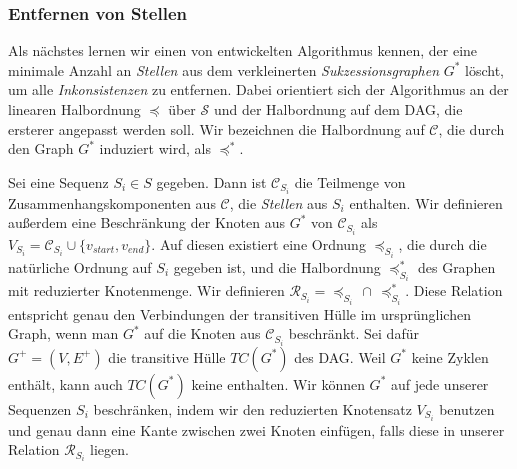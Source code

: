 \begin{center}
\end{center}

\subsubsection{Entfernen von Stellen}

Als nächstes lernen wir einen von \cite{pdc10} entwickelten Algorithmus kennen, der eine minimale Anzahl an \emph{Stellen} aus dem verkleinerten \emph{Sukzessionsgraphen} $G^{*}$ löscht, um alle \emph{Inkonsistenzen} zu entfernen. Dabei orientiert sich der Algorithmus an der linearen Halbordnung $\preceq$ über $\mathcal{S}$ und der Halbordnung auf dem DAG, die ersterer angepasst werden soll. Wir bezeichnen die Halbordnung auf $\mathcal{C}$, die durch den Graph $G^{*}$ induziert wird, als $\preceq^{*}$.

Sei eine Sequenz $S_i \in S$ gegeben. Dann ist $\mathcal{C}_{S_i}$ die Teilmenge von Zusammenhangskomponenten aus $\mathcal{C}$, die \emph{Stellen} aus $S_i$ enthalten. Wir definieren außerdem eine Beschränkung der Knoten aus $G^{*}$ von $\mathcal{C}_{S_i}$ als $V_{S_i} = \mathcal{C}_{S_i} \cup \{v_{start},v_{end}\}$. Auf diesen existiert eine Ordnung $\preceq_{S_i}$, die durch die natürliche Ordnung auf $S_i$ gegeben ist, und die Halbordnung $\preceq_{S_i}^{*}$ des Graphen mit reduzierter Knotenmenge. Wir definieren $\mathcal{R}_{S_i} = \preceq_{S_i}\, \cap\, \preceq_{S_i}^{*}$. Diese Relation entspricht genau den Verbindungen der transitiven Hülle im ursprünglichen Graph, wenn man $G^{*}$ auf die Knoten aus $\mathcal{C}_{S_i}$ beschränkt. Sei dafür $G^{+} = (V,E^{+})$ die transitive Hülle $TC(G^{*})$ des DAG. Weil $G^{*}$ keine Zyklen enthält, kann auch $TC(G^{*})$ keine enthalten. Wir können $G^{*}$ auf jede unserer Sequenzen $S_i$ beschränken, indem wir den reduzierten Knotensatz $V_{S_i}$ benutzen und genau dann eine Kante zwischen zwei Knoten einfügen, falls diese in unserer Relation $\mathcal{R}_{S_i}$ liegen.

